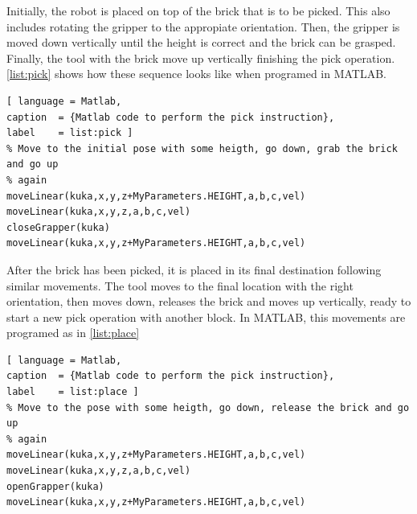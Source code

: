 Initially, the robot is placed on top of the brick that is to be picked. This also includes rotating the gripper to the appropiate orientation. Then, the gripper is moved down vertically until the height is correct and the brick can be grasped. Finally, the tool with the brick move up vertically finishing the pick operation. \autoref{list:pick} shows how these sequence looks like when programed in MATLAB.
\begin{lstlisting}[ language = Matlab,
caption  = {Matlab code to perform the pick instruction},
label    = list:pick ]
% Move to the initial pose with some heigth, go down, grab the brick and go up
% again
moveLinear(kuka,x,y,z+MyParameters.HEIGHT,a,b,c,vel)
moveLinear(kuka,x,y,z,a,b,c,vel)
closeGrapper(kuka)
moveLinear(kuka,x,y,z+MyParameters.HEIGHT,a,b,c,vel)
\end{lstlisting}

After the brick has been picked, it is placed in its final destination following similar movements. The tool moves to the final location with the right orientation, then moves down, releases the brick and moves up vertically, ready to start a new pick operation with another block. In MATLAB, this movements are programed as in \autoref{list:place}
\begin{lstlisting}[ language = Matlab,
caption  = {Matlab code to perform the pick instruction},
label    = list:place ]
% Move to the pose with some heigth, go down, release the brick and go up
% again
moveLinear(kuka,x,y,z+MyParameters.HEIGHT,a,b,c,vel)
moveLinear(kuka,x,y,z,a,b,c,vel)
openGrapper(kuka)
moveLinear(kuka,x,y,z+MyParameters.HEIGHT,a,b,c,vel)
\end{lstlisting}